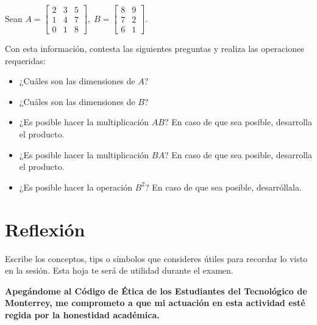 \documentclass[spanish, 10pt]{article}
\begin{document}
\pagebreak

Sean $A = \begin{bmatrix}
    2 & 3 & 5 \\
    1 & 4 & 7 \\
    0 & 1 & 8
\end{bmatrix}, \;
B = \begin{bmatrix}
    8 & 9 \\
    7 & 2 \\
    6 & 1
\end{bmatrix}$.

\vspace{3ex}

Con esta información, contesta las siguientes preguntas y realiza las operaciones requeridas:

\begin{itemize}
    \item ¿Cuáles son las dimensiones de $A$?
    \item ¿Cuáles son las dimensiones de $B$?
    \item ¿Es posible hacer la multiplicación $AB$? En caso de que sea posible, desarrolla el producto.
    \item ¿Es posible hacer la multiplicación $BA$? En caso de que sea posible, desarrolla el producto.
    \item ¿Es posible hacer la operación $B^2$? En caso de que sea posible, desarróllala.
\end{itemize}

\vspace{45ñex}

\section{Reflexión}

Escribe los conceptos, tips o símbolos que consideres útiles para recordar lo visto en la sesión. Esta hoja te será de utilidad durante el examen.

\vfill

\textbf{Apegándome al Código de Ética de los Estudiantes del Tecnológico de Monterrey, me comprometo a que mi actuación en esta actividad esté regida por la honestidad académica.}
\end{document}
